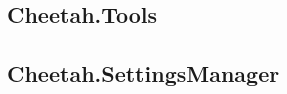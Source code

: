 \subsection{Cheetah.Tools}
\label{libraries.tools}


\subsection{Cheetah.SettingsManager}
\label{libraries.SettingsManager}


